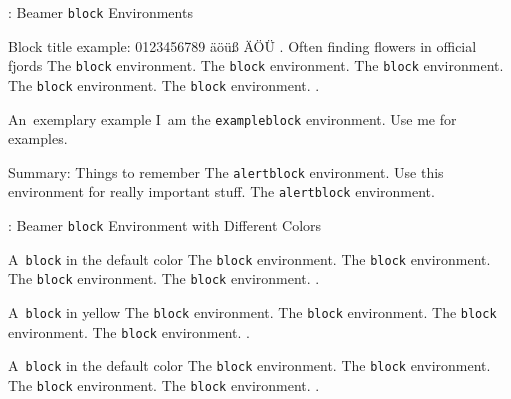 \begin{frame}{\titleprefix: Beamer \texttt{block} Environments}

\begin{block}{Block title example: 0123456789 äöüß ÄÖÜ \texteuro. Often finding flowers in official fjords}
	The \texttt{block} environment. The \texttt{block} environment. The \texttt{block} environment. The \texttt{block} environment. The \texttt{block} environment. \insertblocktitle.\strut  %
\end{block}%

\begin{exampleblock}{An~exemplary example}
	I~am the \texttt{exampleblock} environment. Use me for examples.\strut  %
\end{exampleblock}

\begin{alertblock}{Summary: Things to remember}
	The \texttt{alertblock} environment. Use this environment for really important stuff. The \texttt{alertblock} environment.\strut  %
\end{alertblock}

\end{frame}


\begin{frame}{\titleprefix: Beamer \texttt{block} Environment with Different Colors}

\begin{block}{A~\texttt{block} in the default color}
	The \texttt{block} environment. The \texttt{block} environment. The \texttt{block} environment. The \texttt{block} environment. \insertblocktitle.\strut  %
\end{block}%

{%
\renewcommand{\framedblockcolor}{UBonnYellow}%
\begin{block}{A~\texttt{block} in yellow}
	The \texttt{block} environment. The \texttt{block} environment. The \texttt{block} environment. The \texttt{block} environment. \insertblocktitle.\strut  %
\end{block}%
}

\begin{block}{A~\texttt{block} in the default color}
	The \texttt{block} environment. The \texttt{block} environment. The \texttt{block} environment. The \texttt{block} environment. \insertblocktitle.\strut  %
\end{block}%

\end{frame}



